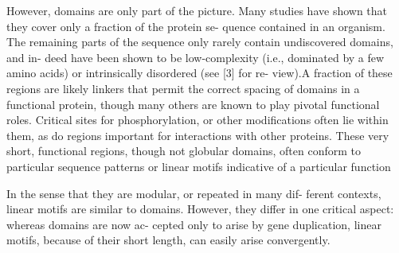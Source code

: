 







However, domains are only part of the picture. Many studies
have shown that they cover only a fraction of the protein se-
quence contained in an organism. The remaining parts of the
sequence only rarely contain undiscovered domains, and in-
deed have been shown to be low-complexity (i.e., dominated
by a few amino acids) or intrinsically disordered (see [3] for re-
view).A fraction of these regions are likely linkers that permit
the correct spacing of domains in a functional protein, though
many others are known to play pivotal functional roles. 
Critical sites for phosphorylation,
or other modifications often
lie within them, as do regions important for interactions with
other proteins. These very short, functional regions, though
not globular domains, often conform to particular sequence
patterns or linear motifs indicative of a particular function

In the sense that they are modular, or repeated in many dif-
ferent contexts, linear motifs are similar to domains. However,
they differ in one critical aspect: whereas domains are now ac-
cepted only to arise by gene duplication, linear motifs, because
of their short length, can easily arise convergently.


